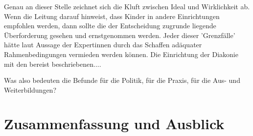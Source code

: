 Genau an dieser Stelle zeichnet sich die Kluft zwischen Ideal und Wirklichkeit ab. Wenn die Leitung darauf hinweist, dass Kinder in andere Einrichtungen empfohlen werden, dann sollte die der Entscheidung zugrunde liegende Überforderung gesehen und ernstgenommen werden. Jeder dieser 'Grenzfälle' hätte laut Aussage der Expertinnen durch das Schaffen adäquater Rahmenbedingungen vermieden werden können. Die Einrichtung der Diakonie mit den bereist beschriebenen....   


Was also bedeuten die Befunde für die Politik, für die Praxis, für die Aus- und Weiterbildungen?

  






\chapter{Zusammenfassung und Ausblick}

 

  



  
 




   

 
 
 
 
